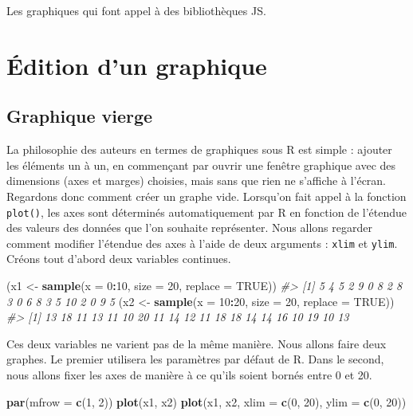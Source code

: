 \documentclass[]{article}
\newenvironment{Shaded}{\begin{snugshade}}{\end{snugshade}}
\newcommand{\CommentTok}[1]{\textcolor[rgb]{0.56,0.35,0.01}{\textit{#1}}}
\newcommand{\DataTypeTok}[1]{\textcolor[rgb]{0.13,0.29,0.53}{#1}}
\newcommand{\DecValTok}[1]{\textcolor[rgb]{0.00,0.00,0.81}{#1}}
\newcommand{\KeywordTok}[1]{\textcolor[rgb]{0.13,0.29,0.53}{\textbf{#1}}}
\newcommand{\NormalTok}[1]{#1}
\newcommand{\OperatorTok}[1]{\textcolor[rgb]{0.81,0.36,0.00}{\textbf{#1}}}
\newcommand{\OtherTok}[1]{\textcolor[rgb]{0.56,0.35,0.01}{#1}}
\newcommand{\StringTok}[1]{\textcolor[rgb]{0.31,0.60,0.02}{#1}}
\begin{document}
Les graphiques qui font appel à des bibliothèques JS.

\hypertarget{uxe9dition-dun-graphique}{%
\section{Édition d'un graphique}\label{uxe9dition-dun-graphique}}

\hypertarget{graphique-vierge}{%
\subsection{Graphique vierge}\label{graphique-vierge}}

La philosophie des auteurs en termes de graphiques sous R est simple : ajouter les éléments un à un, en commençant par ouvrir une fenêtre graphique avec des dimensions (axes et marges) choisies, mais sans que rien ne s'affiche à l'écran. Regardons donc comment créer un graphe vide.
Lorsqu'on fait appel à la fonction \texttt{plot()}, les axes sont déterminés automatiquement par R en fonction de l'étendue des valeurs des données que l'on souhaite représenter. Nous allons regarder comment modifier l'étendue des axes à l'aide de deux arguments : \texttt{xlim} et \texttt{ylim}.
Créons tout d'abord deux variables continues.

\begin{Shaded}
\begin{Highlighting}[]
\NormalTok{(x1 <-}\StringTok{ }\KeywordTok{sample}\NormalTok{(}\DataTypeTok{x =} \DecValTok{0}\OperatorTok{:}\DecValTok{10}\NormalTok{, }\DataTypeTok{size =} \DecValTok{20}\NormalTok{, }\DataTypeTok{replace =} \OtherTok{TRUE}\NormalTok{))}
\CommentTok{#>  [1]  5  4  5  2  9  0  8  2  8  3  0  6  8  3  5 10  2  0  9  5}
\NormalTok{(x2 <-}\StringTok{ }\KeywordTok{sample}\NormalTok{(}\DataTypeTok{x =} \DecValTok{10}\OperatorTok{:}\DecValTok{20}\NormalTok{, }\DataTypeTok{size =} \DecValTok{20}\NormalTok{, }\DataTypeTok{replace =} \OtherTok{TRUE}\NormalTok{))}
\CommentTok{#>  [1] 13 18 11 13 11 10 20 11 14 12 11 18 18 14 14 16 10 19 10 13}
\end{Highlighting}
\end{Shaded}

Ces deux variables ne varient pas de la même manière. Nous allons faire deux graphes. Le premier utilisera les paramètres par défaut de R. Dans le second, nous allons fixer les axes de manière à ce qu'ils soient bornés entre 0 et 20.

\begin{Shaded}
\begin{Highlighting}[]
\KeywordTok{par}\NormalTok{(}\DataTypeTok{mfrow =} \KeywordTok{c}\NormalTok{(}\DecValTok{1}\NormalTok{, }\DecValTok{2}\NormalTok{))}
\KeywordTok{plot}\NormalTok{(x1, x2)}
\KeywordTok{plot}\NormalTok{(x1, x2, }\DataTypeTok{xlim =} \KeywordTok{c}\NormalTok{(}\DecValTok{0}\NormalTok{, }\DecValTok{20}\NormalTok{), }\DataTypeTok{ylim =} \KeywordTok{c}\NormalTok{(}\DecValTok{0}\NormalTok{, }\DecValTok{20}\NormalTok{))}
\end{Highlighting}
\end{Shaded}
\end{document}
